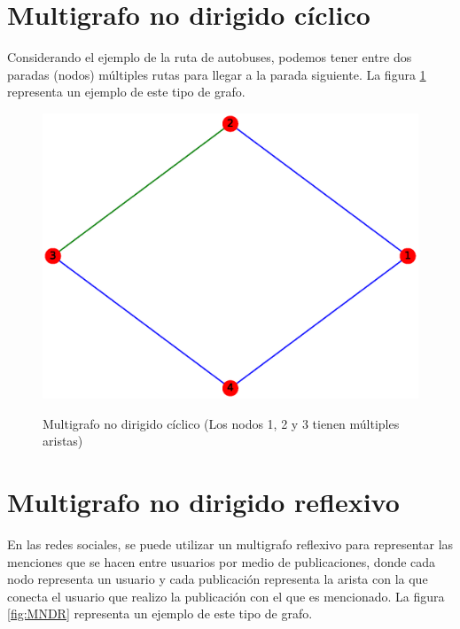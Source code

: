 \documentclass{article}
\begin{document}
\section{Multigrafo no dirigido cíclico}
Considerando el ejemplo de la ruta de autobuses, podemos tener entre dos paradas (nodos) múltiples rutas para llegar a la parada siguiente. La figura \ref{fig:MNDC} representa un ejemplo de este tipo de grafo.
\begin{figure}[h!]
    \caption{Multigrafo no dirigido cíclico (Los nodos 1, 2 y 3 tienen múltiples aristas)}
    \includegraphics[width=\textwidth]{8-MNDC}
    \label{fig:MNDC}
\end{figure}



\section{Multigrafo no dirigido reflexivo}
En las redes sociales, se puede utilizar un multigrafo reflexivo para representar las menciones que se hacen entre usuarios por medio de publicaciones, donde cada nodo representa un usuario y cada publicación representa la arista con la que conecta el usuario que realizo la publicación con el que es mencionado. La figura \ref{fig:MNDR} representa un ejemplo de este tipo de grafo.
\end{document}
